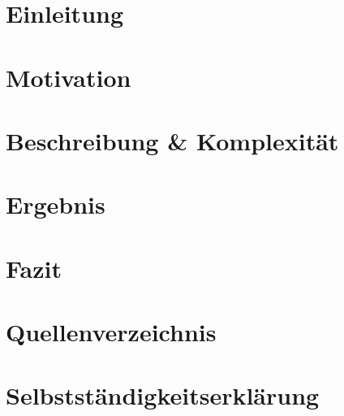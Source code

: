 \documentclass[a4paper, 10pt]{article}
\begin{document}

\newpage
{}
\tableofcontents
\lstlistoflistings
\clearpage 
{} 
\section{Einleitung}

\section{Motivation}

\section{Beschreibung \& Komplexität}

\section{Ergebnis}

\section{Fazit}

\newpage
\section{Quellenverzeichnis}
\printbibliography
\newpage
\section{Selbstständigkeitserklärung}

\end{document}
